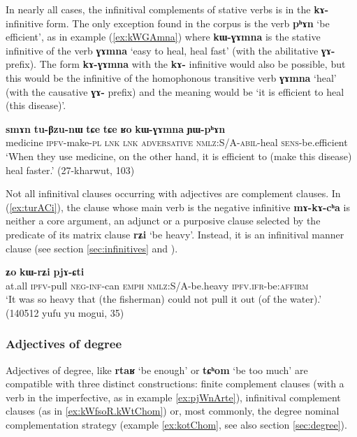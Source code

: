 \documentclass[oneside,a4paper,11pt]{article}
\newcommand{\ipa}[1]{\textbf{\phon#1}} %
\newcommand{\jpg}[2]{\ipa{#1} `#2'} %
\begin{document}
In nearly all cases, the infinitival complements of stative verbs is in the \ipa{kɤ-} infinitive form. The only exception found in the corpus is the verb  \jpg{pʰɤn}{be efficient}, as in example (\ref{ex:kWGAmna}) where \ipa{kɯ-ɣɤmna} is the stative infinitive of the verb \ipa{ɣɤmna} `easy to heal, heal fast' (with the abilitative \ipa{ɣɤ-} prefix). The form \ipa{kɤ-ɣɤmna} with the \ipa{kɤ-} infinitive would also be possible, but this would be the infinitive of the homophonous transitive verb \ipa{ɣɤmna} `heal' (with the causative \ipa{ɣɤ-} prefix) and the meaning would be `it is efficient to heal (this disease)'.
 
 
 \begin{exe}
\ex \label{ex:kWGAmna}
\gll \ipa{smɤn} 	\ipa{tu-βzu-nɯ} 	\ipa{tɕe} 	\ipa{tɕe} 	\ipa{ʁo} 	\ipa{kɯ-ɣɤmna} 	\ipa{ɲɯ-pʰɤn} \\
medicine \textsc{ipfv}-make-\textsc{pl} \textsc{lnk} \textsc{lnk} \textsc{adversative}  \textsc{nmlz:S/A}-\textsc{abil}-heal \textsc{sens}-be.efficient \\
\glt `When they use medicine, on the other hand, it is efficient to (make this disease) heal faster.' (27-kharwut, 103)
\end{exe}

Not all infinitival clauses occurring with adjectives are complement clauses. In (\ref{ex:turACi}), the clause whose main verb is the negative infinitive \ipa{mɤ-kɤ-cʰa} is neither a core argument, an adjunct or a purposive clause selected by the predicate of its matrix clause \jpg{rʑi}{be heavy}. Instead, it is an infinitival manner clause (see section \ref{sec:infinitives} and \citealt{jacques14linking}).

\begin{exe}
\ex \label{ex:turACi}
\gll [\ipa{maka} 	\ipa{tu-rɤɕi} 	\ipa{mɤ-kɤ-cʰa}] 	\ipa{ʑo} 	\ipa{kɯ-rʑi} 	\ipa{pjɤ-ɕti} \\
at.all \textsc{ipfv}-pull \textsc{neg-inf}-can \textsc{emph} \textsc{nmlz}:S/A-be.heavy \textsc{ipfv.ifr}-be:\textsc{affirm} \\
\glt `It was so heavy that (the fisherman) could not pull it out (of the water).' (140512 yufu yu mogui, 35)
\end{exe}

\subsubsection{Adjectives of degree} \label{sec:degree.complement}
Adjectives of degree, like \jpg{rtaʁ}{be enough} or \jpg{tɕʰom}{be too much} are compatible with three distinct constructions: finite complement clauses (with a verb in the imperfective, as in example \ref{ex:pjWnArte}), infinitival complement clauses (as in \ref{ex:kWfsoR.kWtChom}) or, most commonly, the degree nominal complementation strategy (example \ref{ex:kotChom}, see also section \ref{sec:degree}).
\end{document}
